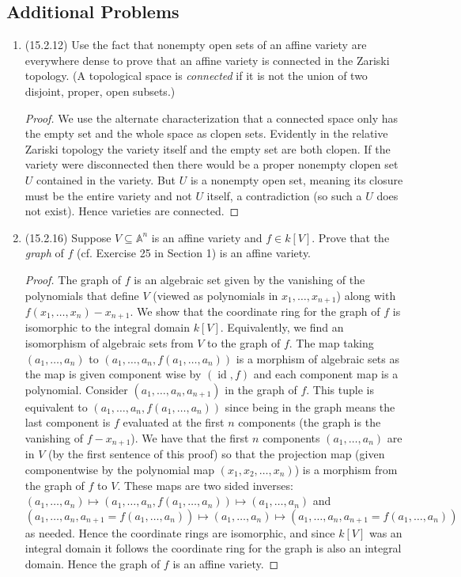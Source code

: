 \documentclass[11pt]{article}
\DeclareMathOperator{\id}{id}
\begin{document}
\subsection*{Additional Problems}
\begin{enumerate}
    \item (15.2.12) Use the fact that nonempty open sets of an affine variety are everywhere dense to prove that an affine variety is connected in the Zariski topology. (A topological space is \textit{connected} if it is not the union of two disjoint, proper, open subsets.) \begin{proof}
        We use the alternate characterization that a connected space only has the empty set and the whole space as clopen sets. Evidently in the relative Zariski topology the variety itself and the empty set are both clopen. If the variety were disconnected then there would be a proper nonempty clopen set $U$ contained in the variety. But $U$ is a nonempty open set, meaning its closure must be the entire variety and not $U$ itself, a contradiction (so such a $U$ does not exist). Hence varieties are connected.
    \end{proof}
    \item (15.2.16) Suppose $V\subseteq \mathbb{A}^n$ is an affine variety and $f\in k[V]$. Prove that the \textit{graph} of $f$ (cf. Exercise 25 in Section 1) is an affine variety. \begin{proof}
        The graph of $f$ is an algebraic set given by the vanishing of the polynomials that define $V$ (viewed as polynomials in $x_1,\dots,x_{n+1}$) along with $f(x_1,\dots,x_n)-x_{n+1}$. We show that the coordinate ring for the graph of $f$ is isomorphic to the integral domain $k[V]$. Equivalently, we find an isomorphism of algebraic sets from $V$ to the graph of $f$. The map taking $(a_1,\dots,a_n)$ to $(a_1,\dots,a_n,f(a_1,\dots,a_n))$ is a morphism of algebraic sets as the map is given component wise by $(\id,f)$ and each component map is a polynomial. Consider $(a_1,\dots,a_n,a_{n+1})$ in the graph of $f$. This tuple is equivalent to $(a_1,\dots,a_n,f(a_1,\dots,a_n))$ since being in the graph means the last component is $f$ evaluated at the first $n$ components (the graph is the vanishing of $f-x_{n+1}$). We have that the first $n$ components $(a_1,\dots,a_n)$ are in $V$ (by the first sentence of this proof) so that the projection map (given componentwise by the polynomial map $(x_1,x_2,\dots,x_n)$) is a morphism from the graph of $f$ to $V$. These maps are two sided inverses: $(a_1,\dots,a_n)\mapsto (a_1,\dots,a_n,f(a_1,\dots,a_n)) \mapsto (a_1,\dots,a_n)$ and $(a_1,\dots,a_n,a_{n+1} = f(a_1,\dots,a_n))\mapsto (a_1,\dots,a_n)\mapsto (a_1,\dots,a_n,a_{n+1} = f(a_1,\dots,a_n))$ as needed. Hence the coordinate rings are isomorphic, and since $k[V]$ was an integral domain it follows the coordinate ring for the graph is also an integral domain. Hence the graph of $f$ is an affine variety.

\end{proof}
\end{enumerate}
\end{document}
